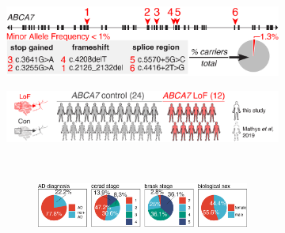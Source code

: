 \begin{figure}[H]
    \begin{subfigure}[t]{.45\textwidth}
        \caption{}
        \includegraphics[width=\textwidth]{./main_plots/abca7_variants_cartoon.png}        
    \end{subfigure}
    \begin{subfigure}[t]{.55\textwidth}
        \caption{}
        \includegraphics[width=\textwidth]{./main_plots/cohort_cartoon.png}        
    \end{subfigure}
    \\[-1ex] 
    \begin{subfigure}[t]{.5\textwidth}
        \begin{subfigure}[t]{\textwidth}
            \caption{}
            \includegraphics[width=\textwidth]{./main_plots/pie_charts.png}        
        \end{subfigure}
        \begin{subfigure}[t]{.45\textwidth}
            \caption{}

\end{subfigure}
\end{subfigure}
\end{figure}
